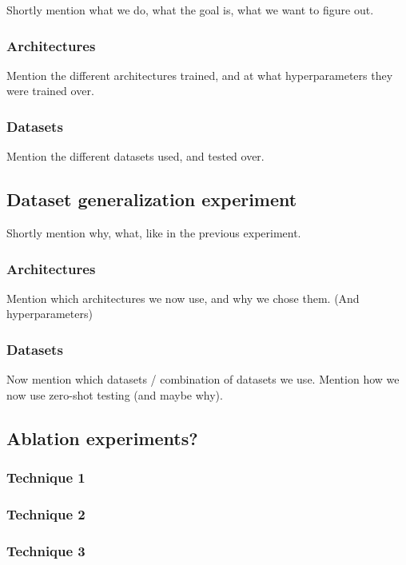 Shortly mention what we do, what the goal is, what we want to figure out.

\subsubsection{Architectures}
Mention the different architectures trained, and at what hyperparameters they were trained over.

\subsubsection{Datasets}
Mention the different datasets used, and tested over.


\subsection{Dataset generalization experiment}

Shortly mention why, what, like in the previous experiment.

\subsubsection{Architectures}

Mention which architectures we now use, and why we chose them. (And hyperparameters)

\subsubsection{Datasets}

Now mention which datasets / combination of datasets we use. Mention how we now use zero-shot testing (and maybe why).


\subsection{Ablation experiments?}

\subsubsection{Technique 1}

\subsubsection{Technique 2}

\subsubsection{Technique 3}